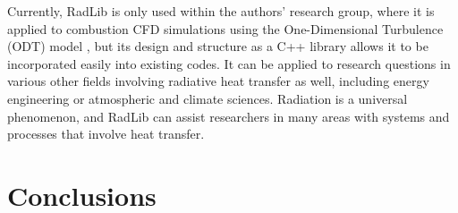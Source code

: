 \documentclass[preprint,12pt, a4paper]{elsarticle}
\begin{document}
Currently, RadLib is only used within the authors' research group, where it is applied to combustion CFD simulations using the One-Dimensional Turbulence (ODT) model \cite{Stephens_2020}, but its design and structure as a C++ library allows it to be incorporated easily into existing codes. It can be applied to  research questions in various other fields involving radiative heat transfer as well, including energy engineering or atmospheric and climate sciences. Radiation is a universal phenomenon, and RadLib can assist researchers in many areas with systems and processes that involve heat transfer. 



\section{Conclusions} \label{s:conclusions}
\end{document}

